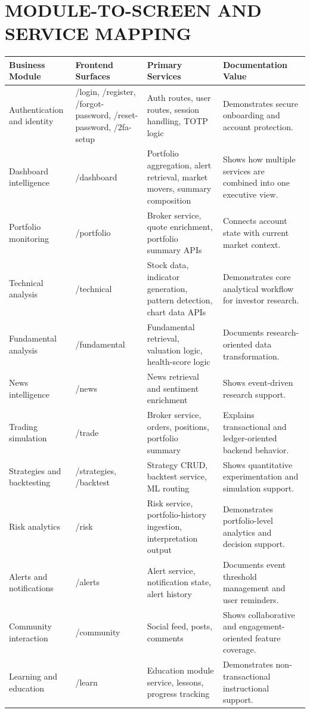 \documentclass[12pt,a4paper]{report}
\begin{document}
\chapter{MODULE-TO-SCREEN AND SERVICE MAPPING}
\begin{longtable}{p{} p{} p{} p{}}
\textbf{Business Module} & \textbf{Frontend Surfaces} & \textbf{Primary Services} & \textbf{Documentation Value} \\
\hline
Authentication and identity & /login, /register, /forgot-password, /reset-password, /2fa-setup & Auth routes, user routes, session handling, TOTP logic & Demonstrates secure onboarding and account protection. \\
Dashboard intelligence & /dashboard & Portfolio aggregation, alert retrieval, market movers, summary composition & Shows how multiple services are combined into one executive view. \\
Portfolio monitoring & /portfolio & Broker service, quote enrichment, portfolio summary APIs & Connects account state with current market context. \\
Technical analysis & /technical & Stock data, indicator generation, pattern detection, chart data APIs & Demonstrates core analytical workflow for investor research. \\
Fundamental analysis & /fundamental & Fundamental retrieval, valuation logic, health-score logic & Documents research-oriented data transformation. \\
News intelligence & /news & News retrieval and sentiment enrichment & Shows event-driven research support. \\
Trading simulation & /trade & Broker service, orders, positions, portfolio summary & Explains transactional and ledger-oriented backend behavior. \\
Strategies and backtesting & /strategies, /backtest & Strategy CRUD, backtest service, ML routing & Shows quantitative experimentation and simulation support. \\
Risk analytics & /risk & Risk service, portfolio-history ingestion, interpretation output & Demonstrates portfolio-level analytics and decision support. \\
Alerts and notifications & /alerts & Alert service, notification state, alert history & Documents event threshold management and user reminders. \\
Community interaction & /community & Social feed, posts, comments & Shows collaborative and engagement-oriented feature coverage. \\
Learning and education & /learn & Education module service, lessons, progress tracking & Demonstrates non-transactional instructional support. \\
\end{longtable}
\end{document}
